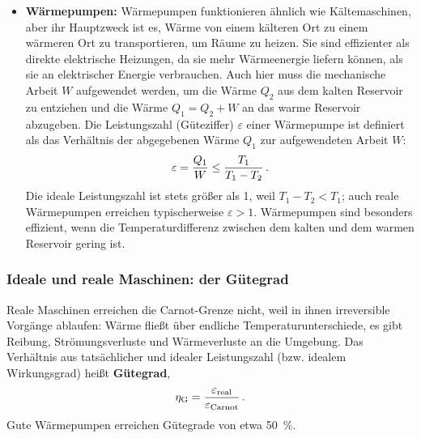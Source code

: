 \begin{itemize}
    \item \textbf{Wärmepumpen:} Wärmepumpen funktionieren ähnlich wie Kältemaschinen, aber ihr Hauptzweck ist es, Wärme von einem kälteren Ort zu einem wärmeren Ort zu transportieren, um Räume zu heizen. Sie sind effizienter als direkte elektrische Heizungen, da sie mehr Wärmeenergie liefern können, als sie an elektrischer Energie verbrauchen. Auch hier muss die mechanische Arbeit $W$ aufgewendet werden, um die Wärme $Q_2$ aus dem kalten Reservoir zu entziehen und die Wärme $Q_1 = Q_2 + W$ an das warme Reservoir abzugeben. Die Leistungszahl (Güteziffer) $\varepsilon$ einer Wärmepumpe ist definiert als das Verhältnis der abgegebenen Wärme $Q_1$ zur aufgewendeten Arbeit $W$:
    \begin{equation}
        \varepsilon = \frac{Q_1}{W} \le \frac{T_1}{T_1 - T_2} \,.
    \end{equation}
    Die ideale Leistungszahl ist stets größer als 1, weil $T_1 - T_2 < T_1$; auch reale Wärmepumpen erreichen typischerweise $\varepsilon > 1$. Wärmepumpen sind besonders effizient, wenn die Temperaturdifferenz zwischen dem kalten und dem warmen Reservoir gering ist.
\end{itemize}

\subsubsection*{Ideale und reale Maschinen: der Gütegrad}
Reale Maschinen erreichen die Carnot-Grenze nicht, weil in ihnen irreversible Vorgänge ablaufen: Wärme fließt über endliche Temperaturunterschiede, es gibt Reibung, Strömungsverluste und Wärmeverluste an die Umgebung. Das Verhältnis aus tatsächlicher und idealer Leistungszahl (bzw. idealem Wirkungsgrad) heißt \textbf{Gütegrad},
\begin{equation}\label{eq: guetegrad}
    \eta_\text{G} = \frac{\varepsilon_\text{real}}{\varepsilon_\text{Carnot}} \,.
\end{equation}
Gute Wärmepumpen erreichen Gütegrade von etwa \SI{50}{\percent}.

